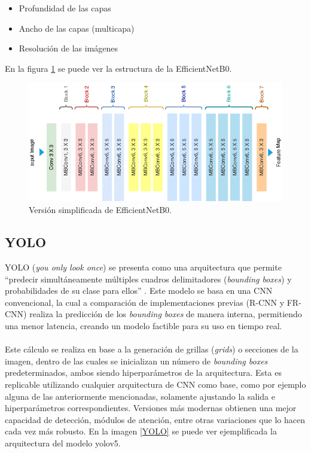 \begin{itemize}
    \item Profundidad de las capas
    \item Ancho de las capas (multicapa)
    \item Resolución de las imágenes
\end{itemize}
En la figura \ref{EfficientNetB0} se puede ver la estructura de la EfficientNetB0. 


\begin{figure}[h!]
\includegraphics[width=1\textwidth]{images/EfficientNetB0.png}
\centering
\caption{Versión simplificada de EfficientNetB0. \protect\cite{EfficientNetB0} }
\label{EfficientNetB0}
\end{figure}

\subsection{YOLO}
YOLO (\textit{you only look once}) se presenta como una arquitectura que permite 
``predecir simultáneamente múltiples cuadros delimitadores (\textit{bounding boxes}) 
y probabilidades de su clase para ellos'' \cite{Redmon2015}. Este modelo se basa en 
una CNN convencional, la cual a comparación de implementaciones previas (R-CNN y FR-CNN) 
realiza la predicción de los \textit{bounding boxes} de manera interna, permitiendo una 
menor latencia, creando un modelo factible para su uso en tiempo real.\\\\
Este cálculo se realiza en base a la generación de grillas (\textit{grids}) o secciones 
de la imagen, dentro de las cuales se inicializan un número de \textit{bounding boxes} 
predeterminados, ambos siendo hiperparámetros de la arquitectura. Esta es replicable 
utilizando cualquier arquitectura de CNN como base, como por ejemplo alguna de las 
anteriormente mencionadas, solamente ajustando la salida e hiperparámetros correspondientes. 
Versiones más modernas obtienen una mejor capacidad de detección, módulos de atención, 
entre otras variaciones que lo hacen cada vez más robusto. En la imagen \ref{YOLO} se 
puede ver ejemplificada la arquitectura del modelo yolov5.

